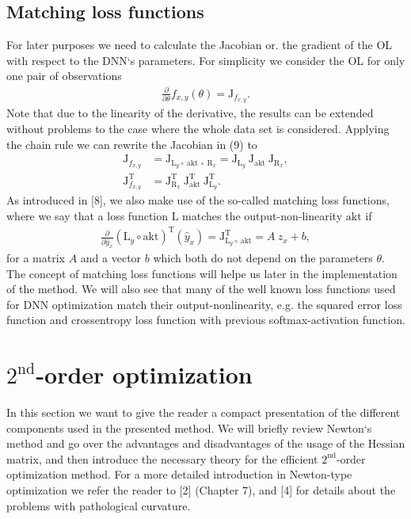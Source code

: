 \documentclass[conference]{IEEEtran}
\begin{document}
\subsection{Matching loss functions}
For later purposes we need to calculate the Jacobian or. the gradient of the OL with respect to the DNN`s parameters. For simplicity we consider the OL for only one pair of observations
\begin{align}
\frac{\partial}{\partial\theta}f_{x, y}(\theta) = \mathrm{J}_{f_{x, y}}.
\end{align}
Note that due to the linearity of the derivative, the results can be extended without problems to the case where the whole data set is considered.
Applying the chain rule we can rewrite the Jacobian in (9) to
\begin{align}
\mathrm{J}_{f_{x, y}} &= \mathrm{J}_{\mathrm{L}_{y}\circ \:\text{akt} \:\circ\:\mathrm{R}_{x}} = \mathrm{J}_{\mathrm{L}_{y}} \: \mathrm{J}_{\text{akt}} \: \mathrm{J}_{\mathrm{R}_{x}},\\
\mathrm{J}_{f_{x, y}}^{\mathrm{T}} &= \mathrm{J}_{\mathrm{R}_{x}}^{\mathrm{T}} \: \mathrm{J}_{\text{akt}}^{\mathrm{T}} \: \mathrm{J}_{\mathrm{L}_{y}}^{\mathrm{T}}.
\end{align}
As introduced in [8], we also make use of the so-called matching loss functions, where we say that a loss function $\mathrm{L}$ matches the output-non-linearity $\text{akt}$ if
\begin{align}
\frac{\partial}{\partial\hat{y}_{x}}\left(\mathrm{L}_{y}\circ \text{akt}\right)^{\mathrm{T}}(\hat{y}_{x})= \mathrm{J}_{\mathrm{L}_{y}\circ \:\text{akt}}^{\mathrm{T}} = A\: z_{x} + b,
\end{align}
for a matrix $A$ and a vector $b$ which both do not depend on the parameters $\theta$.
The concept of matching loss functions will helpe us later in the implementation of the method. We will also see that many of the well known loss functions used for DNN optimization match their output-nonlinearity, e.g. the squared error loss function and crossentropy loss function with previous softmax-activation function.


\section{$2^{\text{nd}}$-order optimization}
In this section we want to give the reader a compact presentation of the different components used in the presented method. We will briefly review Newton`s method and go over the advantages and disadvantages of the usage of the Hessian matrix, and then introduce the necessary theory for the efficient $2^{\text{nd}}$-order optimization method. For a more detailed introduction in Newton-type optimization we refer the reader to [2] (Chapter 7), and [4] for details about the problems with pathological curvature. 
\end{document}
